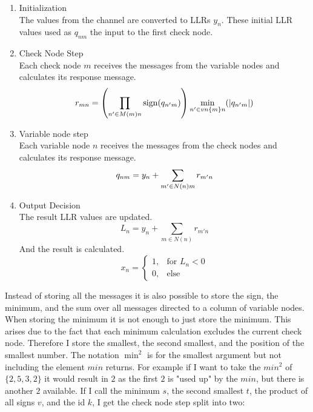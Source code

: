 \begin{enumerate}
\item{Initialization}\\
The values from the channel are converted to LLRs $y_n$. These initial LLR values used as $q_{nm}$ the input to the first check node.

\item{Check Node Step}\\
Each check node $m$ receives the messages from the variable nodes and calculates its response message.
\begin{equation}
    r_{mn} = \left( \prod_{n' \in M(m)\\n}\operatorname{sign}(q_{n'm}) \right) \min_{n' \in vn\{m\}\\n}(\left|q_{n'm}\right|)
\end{equation}

\item{Variable node step}\\
Each variable node $n$ receives the messages from the check nodes and calculates its response message.
\begin{equation}
    q_{nm} = y_n + \sum_{m' \in N(n)\\ m}r_{m'n}
\end{equation}

\item{Output Decision}\\
The result LLR values are updated.
\begin{equation}
    L_n = y_n + \sum_{m \in N(n)}r_{m'n}
\end{equation}
And the result is calculated.
\begin{equation}
    x_n = \begin{cases}
        1, & \text{for } L_n < 0 \\
        0, & \text{else}
    \end{cases}
\end{equation}

\end{enumerate}

Instead of storing all the messages it is also possible to store the sign, the minimum, and the sum over all messages directed to a column of variable nodes. When storing the minimum it is not enough to just store the minimum. This arises due to the fact that each minimum calculation excludes the current check node. Therefore I store the smallest, the second smallest, and the position of the smallest number. The notation $\min^2$ is for the smallest argument but not including the element $min$ returns. For example if I want to take the $min^2$ of $\{2, 5, 3, 2\}$ it would result in $2$ as the first $2$ is "used up" by the $min$, but there is another $2$ available. If I call the minimum $s$, the second smallest $t$, the product of all signs $v$, and the id $k$, I get the check node step split into two:

